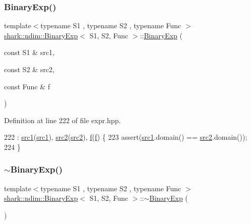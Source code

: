 \subsubsection{\texorpdfstring{Binary\+Exp()}{BinaryExp()}}
{\footnotesize\ttfamily template$<$typename S1 , typename S2 , typename Func $>$ \\
\hyperlink{classshark_1_1ndim_1_1_binary_exp}{shark\+::ndim\+::\+Binary\+Exp}$<$ S1, S2, Func $>$\+::\hyperlink{classshark_1_1ndim_1_1_binary_exp}{Binary\+Exp} (\begin{DoxyParamCaption}\item[{const S1 \&}]{src1,  }\item[{const S2 \&}]{src2,  }\item[{const Func \&}]{f }\end{DoxyParamCaption})}



Definition at line 222 of file expr.\+hpp.


\begin{DoxyCode}
222                                                                                      : 
      \hyperlink{classshark_1_1ndim_1_1_binary_exp_adca0646eb1ee123dc4312644a39ffdb6}{src1}(\hyperlink{classshark_1_1ndim_1_1_binary_exp_adca0646eb1ee123dc4312644a39ffdb6}{src1}), \hyperlink{classshark_1_1ndim_1_1_binary_exp_a42495dbe9f1fdc13b53fc53d21c847a1}{src2}(\hyperlink{classshark_1_1ndim_1_1_binary_exp_a42495dbe9f1fdc13b53fc53d21c847a1}{src2}), \hyperlink{classshark_1_1ndim_1_1_binary_exp_a96d3a36d75f44be439e3550d40135714}{f}(\hyperlink{classshark_1_1ndim_1_1_binary_exp_a96d3a36d75f44be439e3550d40135714}{f}) \{
223             assert(\hyperlink{classshark_1_1ndim_1_1_binary_exp_adca0646eb1ee123dc4312644a39ffdb6}{src1}.domain() == \hyperlink{classshark_1_1ndim_1_1_binary_exp_a42495dbe9f1fdc13b53fc53d21c847a1}{src2}.domain());
224         \}
\end{DoxyCode}
\hypertarget{classshark_1_1ndim_1_1_binary_exp_a99f2360463738318d1b5c67db1f60252}{}\label{classshark_1_1ndim_1_1_binary_exp_a99f2360463738318d1b5c67db1f60252} 
\subsubsection{\texorpdfstring{$\sim$\+Binary\+Exp()}{~BinaryExp()}}
{\footnotesize\ttfamily template$<$typename S1 , typename S2 , typename Func $>$ \\
\hyperlink{classshark_1_1ndim_1_1_binary_exp}{shark\+::ndim\+::\+Binary\+Exp}$<$ S1, S2, Func $>$\+::$\sim$\hyperlink{classshark_1_1ndim_1_1_binary_exp}{Binary\+Exp} (\begin{DoxyParamCaption}{ }\end{DoxyParamCaption})}



